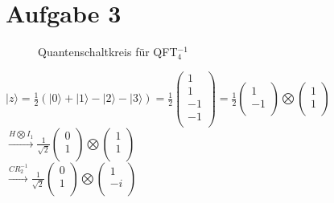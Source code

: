 \documentclass[a4paper]{scrartcl}
\begin{document}
\section*{Aufgabe 3}
\begin{figure}[htp] 
\caption{Quantenschaltkreis für QFT$_{4}^{-1}$}
\end{figure}

$|z\rangle = \frac{1}{2} (|0\rangle + |1\rangle - |2\rangle - |3\rangle) = \frac{1}{2} \begin{pmatrix} 1\\1\\-1\\-1\\\end{pmatrix} = \frac{1}{2} \begin{pmatrix} 1\\-1\\\end{pmatrix} \bigotimes \begin{pmatrix} 1\\1\\\end{pmatrix}$\\
$\xrightarrow{H\bigotimes I_1} \frac{1}{\sqrt{2}} \begin{pmatrix} 0\\1\\\end{pmatrix} \bigotimes \begin{pmatrix} 1\\1\\\end{pmatrix}$\\
$\xrightarrow{CR_2^{-1}}\frac{1}{\sqrt{2}} \begin{pmatrix} 0\\1\\\end{pmatrix} \bigotimes \begin{pmatrix} 1\\-i\\\end{pmatrix}$\\
\end{document}
